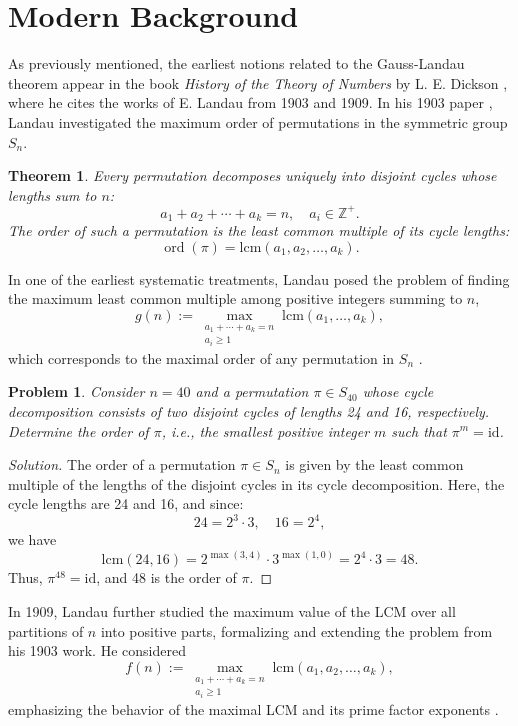 \documentclass[11pt]{article}
\theoremstyle{plain}
\newtheorem{theorem}{Theorem}
\newtheorem*{problem}{Problem}
\begin{document}
\section{Modern Background}
As previously mentioned, the earliest notions related to the Gauss-Landau theorem appear in the book \textit{History of the Theory of Numbers} by L. E. Dickson \cite{Dickson1919}, where he cites the works of E. Landau from 1903 and 1909. 
In his 1903 paper \cite{Landau1903}, Landau investigated the maximum order of permutations in the symmetric group \( S_n \). 
\begin{theorem}
Every permutation decomposes uniquely into disjoint cycles whose lengths sum to \( n \):
\[
a_1 + a_2 + \cdots + a_k = n, \quad a_i \in \mathbb{Z}^+.
\]
The order of such a permutation is the least common multiple of its cycle lengths:
\[
\operatorname{ord}(\pi) = \mathrm{lcm}(a_1, a_2, \dots, a_k).
\]
\end{theorem}

\noindent
In one of the earliest systematic treatments, Landau posed the problem of finding the maximum least common multiple among positive integers summing to \( n \),
\[
g(n) := \max_{\substack{a_1 + \cdots + a_k = n \\ a_i \geq 1}} \mathrm{lcm}(a_1, \dots, a_k),
\]
which corresponds to the maximal order of any permutation in \( S_n \) \cite[p.~47]{Dickson1919}.
\medskip
\begin{problem}
Consider \( n = 40 \) and a permutation \( \pi \in S_{40} \) whose cycle decomposition consists of two disjoint cycles of lengths 24 and 16, respectively. Determine the order of \( \pi \), i.e., the smallest positive integer \( m \) such that \( \pi^m = \mathrm{id} \).
\end{problem}
\begin{proof}[Solution]
   The order of a permutation \( \pi \in S_n \) is given by the least common multiple of the lengths of the disjoint cycles in its cycle decomposition. Here, the cycle lengths are 24 and 16, and since:
\[
24 = 2^3 \cdot 3, \quad 16 = 2^4,
\]
we have
\[
\mathrm{lcm}(24,16) = 2^{\max(3,4)} \cdot 3^{\max(1,0)} = 2^4 \cdot 3 = 48.
\]
Thus, \(\pi^{48} = \mathrm{id}\), and 48 is the order of \(\pi\).
\end{proof}


\medskip

In 1909, Landau \cite{Landau1909} further studied the maximum value of the LCM over all partitions of \( n \) into positive parts, formalizing and extending the problem from his 1903 work. He considered
\[
f(n) := \max_{\substack{a_1 + \cdots + a_k = n \\ a_i \geq 1}} \mathrm{lcm}(a_1, a_2, \dots, a_k),
\]
emphasizing the behavior of the maximal LCM and its prime factor exponents \cite[p. 52]{Dickson1919}.
\end{document}
